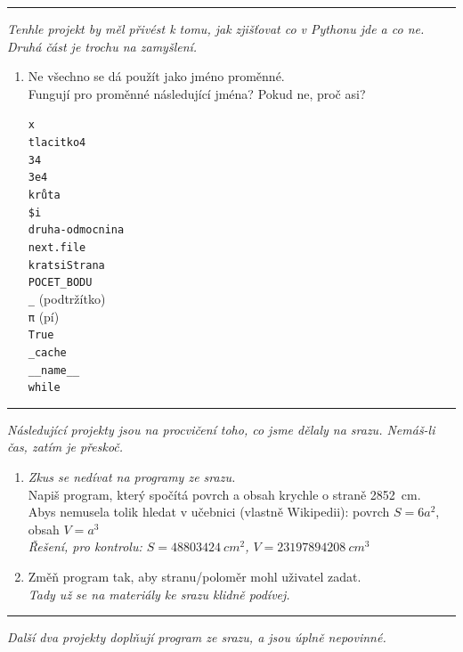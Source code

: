 \documentclass[a4paper,10pt]{article}
\newcommand\startsection[1]{
     \vspace{0.2ex}
    \hrule
    {\fontspec{Oxygen} \tiny
     \vspace{-1ex}
     \emph{#1}
     \vspace{-1.5em}
    }
}
\begin{document}
\startsection{Tenhle projekt by měl přivést k tomu, jak zjišťovat co v Pythonu jde a co ne.
Druhá část je trochu na zamyšlení.}

\begin{enumerate}[resume]
\item Ne všechno se dá použít jako jméno proměnné.
    \\Fungují pro proměnné následující jména? Pokud ne, proč asi?
    {
        \newcommand\varname[2][]{\varnameend[#1]{#2}\\[0.25cm]}
        \newcommand\varnameend[2][]{\texttt{#2} #1}
        \begin{multicols}{4}
        \varname{x}
        \varname{tlacitko4}
        \varname{34}
        \varname{3e4}
        \varname{krůta}
        \varname{\$i}
        \varname{druha-odmocnina}
        \varname{next.file}
        \varname{kratsiStrana}
        \varname{POCET\_BODU}
        \varname[(podtržítko)]{\_}
        \varname[(pí)]{\textrm{π}}
        \varname{True}
        \varname{\_cache}
        \varname{\_\_name\_\_}
        \varnameend{while}
        \end{multicols}
    }

\end{enumerate}

\startsection{Následující projekty jsou na procvičení toho, co jsme dělaly na srazu.
Nemáš-li čas, zatím je přeskoč.}

\begin{enumerate}[resume]

\item \emph{\small Zkus se nedívat na programy ze srazu.}
    \\Napiš program, který spočítá povrch a obsah krychle o straně \SI{2852}{cm}.
    \\Abys nemusela tolik hledat v učebnici (vlastně Wikipedii): povrch $S=6a^2$, obsah $V=a^3$
    \\\emph{\small Řešení, pro kontrolu: $S=\SI{48803424}{cm^2}$, $V=\SI{23197894208}{cm^3}$}

\item Změň program tak, aby stranu/poloměr mohl uživatel zadat.
    \\\emph{\small Tady už se na materiály ke srazu klidně podívej.}

\end{enumerate}

\startsection{Další dva projekty doplňují program ze srazu, a jsou úplně nepovinné.}
\end{document}
